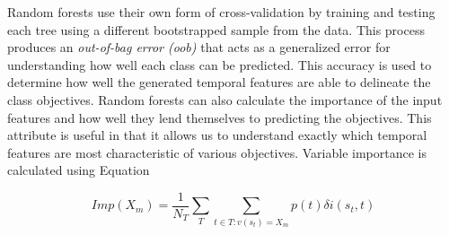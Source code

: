 Random forests use their own form of cross-validation by training and testing each tree using a different bootstrapped sample from the data. This process produces an \emph{out-of-bag error (oob)} that acts as a generalized error for understanding how well each class can be predicted. This accuracy is used to determine how well the generated temporal features are able to delineate the class objectives. Random forests can also calculate the importance of the input features and how well they lend themselves to predicting the objectives. This attribute is useful in that it allows us to understand exactly which temporal features are most characteristic of various objectives. Variable importance is calculated using Equation

\begin{equation}
Imp(X_m) = \frac{1}{N_T}\sum\limits_T\sum\limits_{t\in T:v(s_t)=X_m} p(t) \delta i (s_t, t)
\label{eq:varimportance}
\end{equation}

